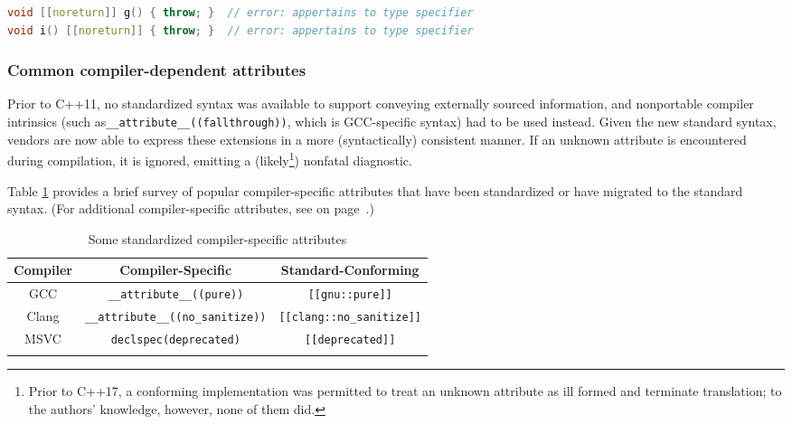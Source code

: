 \begin{lstlisting}[language=C++]
void [[noreturn]] g() { throw; }  // error: appertains to type specifier
void i() [[noreturn]] { throw; }  // error: appertains to type specifier
\end{lstlisting}


\subsubsection[Common compiler-dependent attributes]{Common compiler-dependent attributes}\label{common-compiler-dependent-attributes}

Prior to C++11, no standardized syntax was available to support conveying
externally sourced information, and nonportable compiler intrinsics
(such as\linebreak[4] \mbox{\texttt{\_\_attribute\_\_((fallthrough))}}, which is
GCC-specific syntax) had to be used instead. Given the new standard
syntax, vendors are now able to express these extensions in a more
(syntactically) consistent manner. If an unknown attribute is
encountered during compilation, it is ignored, emitting a (likely{\cprotect\footnote{Prior to C++17, a conforming implementation was
permitted to treat an unknown attribute as ill formed and terminate
  translation; to the authors' knowledge, however, none of them did.}}) nonfatal
diagnostic.

Table \ref{attribute-table1} provides a brief survey of popular compiler-specific attributes
that have been standardized or have migrated to the standard syntax. (For
additional compiler-specific attributes, see {\it{}} on page~\pageref{attribute-further-reading}.)

\begin{table}[h!]
\begin{center}
\begin{threeparttable}
\caption{Some standardized compiler-specific attributes}\label{attribute-table1}\vspace{1.5ex}
{\small \begin{tabular}{c|c|c}\thickhline
\rowcolor[gray]{.9}   {\sffamily\bfseries Compiler} & {\sffamily\bfseries Compiler-Specific} &
{\sffamily\bfseries Standard-Conforming} \\ \hline
GCC &\texttt{\_\_attribute\_\_((pure))} & \texttt{[[gnu::pure]]} \\ \hline
Clang & \texttt{\_\_attribute\_\_((no\_sanitize))} &\texttt{[[clang::no\_sanitize]]} \\ \hline
MSVC & \texttt{declspec(deprecated)} & \texttt{[[deprecated]]} \\ \thickhline
\end{tabular}
}
\end{threeparttable}
\end{center}
\end{table}


